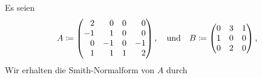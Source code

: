 \section{}



\addtocounter{subsection}{1}



\subsection{}

Es seien
\[
            A
  \defined  \begin{pmatrix*}[r]
               2  &  0  & 0 &  0  \\
              -1  &  1  & 0 &  0  \\
               0  & -1  & 0 & -1  \\
               1  &  1  & 1 &  2
            \end{pmatrix*},
  \quad\text{und}\quad
            B
  \defined  \begin{pmatrix*}[r]
              0 & 3 & 1 \\
              1 & 0 & 0 \\
              0 & 2 & 0
            \end{pmatrix*},
\]
Wir erhalten die Smith-Normalform von $A$ durch
